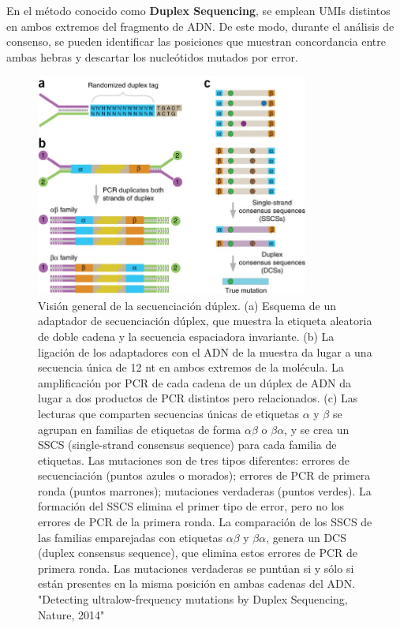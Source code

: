 \begin{itemize}
En el método conocido como \textbf{Duplex Sequencing}, se emplean UMIs distintos en ambos extremos del fragmento de ADN. De este modo, durante el análisis de consenso, se pueden identificar las posiciones que muestran concordancia entre ambas hebras y descartar los nucleótidos mutados por error.

\begin{figure}[htbp]
\centering
\includegraphics[width = 0.8\textwidth]{figs/duplex-sequencing.jpg}
\caption{Visión general de la secuenciación dúplex. (a) Esquema de un adaptador de secuenciación dúplex, que muestra la etiqueta aleatoria de doble cadena y la secuencia espaciadora invariante. (b) La ligación de los adaptadores con el ADN de la muestra da lugar a una secuencia única de 12 nt en ambos extremos de la molécula. La amplificación por PCR de cada cadena de un dúplex de ADN da lugar a dos productos de PCR distintos pero relacionados. (c) Las lecturas que comparten secuencias únicas de etiquetas $\alpha$ y $\beta$ se agrupan en familias de etiquetas de forma $\alpha \beta$ o $\beta \alpha$, y se crea un SSCS (single-strand consensus sequence) para cada familia de etiquetas. Las mutaciones son de tres tipos diferentes: errores de secuenciación (puntos azules o morados); errores de PCR de primera ronda (puntos marrones); mutaciones verdaderas (puntos verdes). La formación del SSCS elimina el primer tipo de error, pero no los errores de PCR de la primera ronda. La comparación de los SSCS de las familias emparejadas con etiquetas $\alpha \beta$ y $\beta \alpha$, genera un DCS (duplex consensus sequence), que elimina estos errores de PCR de primera ronda. Las mutaciones verdaderas se puntúan si y sólo si están presentes en la misma posición en ambas cadenas del ADN. "Detecting ultralow-frequency mutations by Duplex Sequencing, Nature, 2014"}
\end{figure}


\end{itemize}

